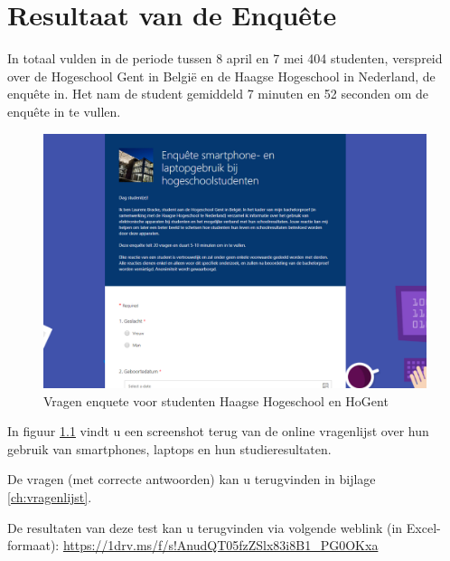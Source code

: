 
\chapter{Resultaat van de Enquête}
\label{ch:resultaten_vragen}

In totaal vulden in de periode tussen 8 april en 7 mei 404 studenten, verspreid over de Hogeschool Gent in België en de Haagse Hogeschool in Nederland, de enquête in. Het nam de student gemiddeld 7 minuten en 52 seconden om de enquête in te vullen.

\begin{figure}
	\includegraphics[width=\textwidth]
	{img/vragen-enquete.png}
	\caption{Vragen enquete voor studenten Haagse Hogeschool en HoGent }
	\label{fig:vragen-enquete}
\end{figure}

In figuur \ref{fig:vragen-enquete} vindt u een screenshot terug van de online vragenlijst over hun gebruik van smartphones, laptops en hun studieresultaten. 

De vragen (met correcte antwoorden) kan u terugvinden in bijlage \ref{ch:vragenlijst}.

De resultaten van deze test kan u terugvinden via volgende weblink (in Excel-formaat): \url{https://1drv.ms/f/s!AnudQT05fzZSlx83i8B1_PG0OKxa} 

